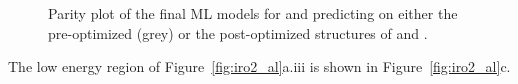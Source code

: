 \begin{figure}[!htb]
\centering
{}
\caption{\label{fig:parity}
%
Parity plot of the final ML models for \IrOtwo and \IrOthree predicting on either the pre-optimized (grey) or the post-optimized structures of \IrOtwo and \IrOthree.
}
\end{figure}


The low energy region of Figure~\ref{fig:iro2_al}a.iii is shown in Figure~\ref{fig:iro2_al}c.
%




